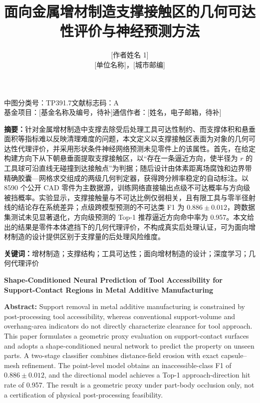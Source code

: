 \documentclass[UTF8,a4paper,twocolumn]{ctexart}
\title{面向金属增材制造支撑接触区的几何可达性评价与神经预测方法}
\author{[作者姓名 1]\quad [作者姓名 2]\quad [作者姓名 3]\\[2pt]
\small [单位名称]，[城市\quad 邮编]}
\date{}
\begin{document}
\setcounter{secnumdepth}{0}
\onecolumn
  \maketitle
  \vspace{-1.0em}
  \noindent\small 中图分类号：TP391.7\hfill 文献标志码：A\\
  基金项目：[基金名称及编号，待补]\hfill 通信作者：[姓名，电子邮箱，待补]
  \vspace{0.4em}
  \begin{minipage}{0.96\textwidth}\small
  \noindent\textbf{摘\quad 要：}针对金属增材制造中支撑去除受后处理工具可达性制约、而支撑体积和悬垂面积等指标难以反映清理难度的问题，本文定义以支撑接触区表面为对象的几何可达性代理评价，并采用形状条件神经网络预测未见零件上的该属性。首先，在给定构建方向下从下朝悬垂面提取支撑接触区，以“存在一条逼近方向，使半径为 $r$ 的工具球可沿直线无碰撞到达接触点”为判据；随后设计由体素距离场腐蚀和边界带精确胶囊—网格求交组成的两级几何判定器，获得跨分辨率稳定的自动标注。以 8590 个公开 CAD 零件为主数据源，训练网络直接输出点级不可达概率与方向级被挡概率。实验显示，支撑接触量与不可达比例仅弱相关，且有限工具与零半径射线的结论存在系统差异；点级跨模型预测的不可达类 F1 为 $0.886\pm0.012$，跨数据集测试未见显著退化，方向级预测的 Top-1 推荐逼近方向命中率为 0.957。本文给出的结果是零件本体遮挡下的几何代理评价，不构成真实后处理认证，可为面向增材制造的设计提供区别于支撑量的后处理风险维度。\par\vspace{0.35em}
  \noindent\textbf{关键词：}增材制造；支撑结构；工具可达性；面向增材制造的设计；深度学习；几何代理评价
  \end{minipage}
  \vspace{0.8em}

\begin{center}\bfseries\large
Shape-Conditioned Neural Prediction of Tool Accessibility for Support-Contact Regions in Metal Additive Manufacturing
\end{center}
\noindent\textbf{Abstract:} Support removal in metal additive manufacturing is constrained by post-processing tool accessibility, whereas conventional support-volume and overhang-area indicators do not directly characterize clearance for tool approach. This paper formulates a geometric proxy evaluation on support-contact surfaces and adopts a shape-conditioned neural network to predict the property on unseen parts. A two-stage classifier combines distance-field erosion with exact capsule--mesh refinement. The point-level model obtains an inaccessible-class F1 of $0.886\pm0.012$, and the directional model achieves a Top-1 approach-direction hit rate of 0.957. The result is a geometric proxy under part-body occlusion only, not a certification of physical post-processing feasibility.
\end{document}
